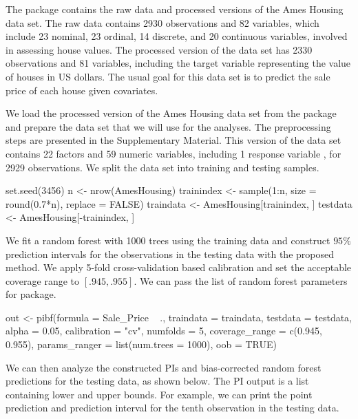 The  \citep{R-AmesHousing} package contains the raw data and processed versions of the Ames Housing data set. The raw data contains 2930 observations and 82 variables, which include 23 nominal, 23 ordinal, 14 discrete, and 20 continuous variables, involved in assessing house values. The processed version of the data set has 2330 observations and 81 variables, including the target variable  representing the value of houses in US dollars. The usual goal for this data set is to predict the sale price of each house given covariates.

We load the processed version of the Ames Housing data set from the  package and prepare the data set that we will use for the analyses. The preprocessing steps are presented in the Supplementary Material. This version of the data set contains 22 factors and 59 numeric variables, including 1 response variable , for 2929 observations. We split the data set into training and testing samples.

\begin{example*}
set.seed(3456)
n <- nrow(AmesHousing)
trainindex <- sample(1:n, size = round(0.7*n), replace = FALSE)
traindata <- AmesHousing[trainindex, ]
testdata <- AmesHousing[-trainindex, ]
\end{example*}

We fit a random forest with 1000 trees using the training data and construct $95\%$ prediction intervals for the observations in the testing data with the proposed method. We apply 5-fold cross-validation based calibration and set the acceptable coverage range to $\left[.945,.955\right]$. We can pass the list of random forest parameters for  package.

\begin{example*}
out <- pibf(formula = Sale_Price ~ .,
            traindata = traindata, 
            testdata = testdata,
            alpha = 0.05,
            calibration = "cv", 
            numfolds = 5,
            coverage_range = c(0.945, 0.955),
            params_ranger = list(num.trees = 1000),
            oob = TRUE)
\end{example*}

We can then analyze the constructed PIs and bias-corrected random forest predictions for the testing data, as shown below. The PI output is a list containing lower and upper bounds. For example, we can print the point prediction and prediction interval for the tenth observation in the testing data.

